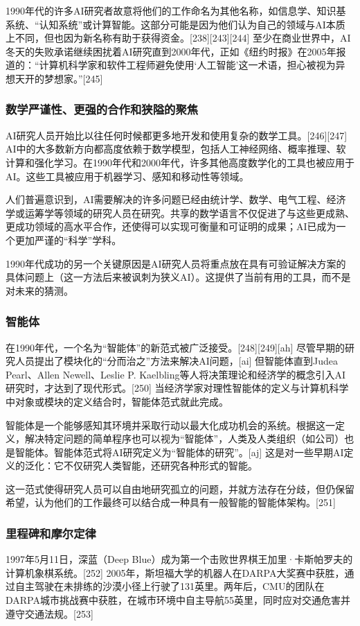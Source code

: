 1990年代的许多AI研究者故意将他们的工作命名为其他名称，如信息学、知识基系统、“认知系统”或计算智能。这部分可能是因为他们认为自己的领域与AI本质上不同，但也因为新名称有助于获得资金。[238][243][244] 至少在商业世界中，AI冬天的失败承诺继续困扰着AI研究直到2000年代，正如《纽约时报》在2005年报道的：“计算机科学家和软件工程师避免使用‘人工智能’这一术语，担心被视为异想天开的梦想家。”[245]
\subsubsection{数学严谨性、更强的合作和狭隘的聚焦 } 
AI研究人员开始比以往任何时候都更多地开发和使用复杂的数学工具。[246][247] AI中的大多数新方向都高度依赖于数学模型，包括人工神经网络、概率推理、软计算和强化学习。在1990年代和2000年代，许多其他高度数学化的工具也被应用于AI。这些工具被应用于机器学习、感知和移动性等领域。

人们普遍意识到，AI需要解决的许多问题已经由统计学、数学、电气工程、经济学或运筹学等领域的研究人员在研究。共享的数学语言不仅促进了与这些更成熟、更成功领域的高水平合作，还使得可以实现可衡量和可证明的成果；AI已成为一个更加严谨的“科学”学科。

1990年代成功的另一个关键原因是AI研究人员将重点放在具有可验证解决方案的具体问题上（这一方法后来被讽刺为狭义AI）。这提供了当前有用的工具，而不是对未来的猜测。
\subsubsection{智能体}  
在1990年代，一个名为“智能体”的新范式被广泛接受。[248][249][ah] 尽管早期的研究人员提出了模块化的“分而治之”方法来解决AI问题，[ai] 但智能体直到Judea Pearl、Allen Newell、Leslie P. Kaelbling等人将决策理论和经济学的概念引入AI研究时，才达到了现代形式。[250] 当经济学家对理性智能体的定义与计算机科学中对象或模块的定义结合时，智能体范式就此完成。

智能体是一个能够感知其环境并采取行动以最大化成功机会的系统。根据这一定义，解决特定问题的简单程序也可以视为“智能体”，人类及人类组织（如公司）也是智能体。智能体范式将AI研究定义为“智能体的研究”。[aj] 这是对一些早期AI定义的泛化：它不仅研究人类智能，还研究各种形式的智能。

这一范式使得研究人员可以自由地研究孤立的问题，并就方法存在分歧，但仍保留希望，认为他们的工作最终可以结合成一种具有一般智能的智能体架构。[251]
\subsubsection{里程碑和摩尔定律}  
1997年5月11日，深蓝（Deep Blue）成为第一个击败世界棋王加里·卡斯帕罗夫的计算机象棋系统。[252] 2005年，斯坦福大学的机器人在DARPA大奖赛中获胜，通过自主驾驶在未排练的沙漠小径上行驶了131英里。两年后，CMU的团队在DARPA城市挑战赛中获胜，在城市环境中自主导航55英里，同时应对交通危害并遵守交通法规。[253]

